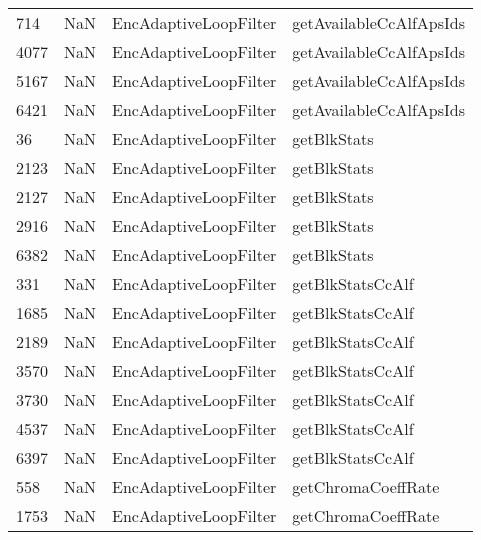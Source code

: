 \begin{tabular}{llll}
714  &                   NaN &      EncAdaptiveLoopFilter &                   getAvailableCcAlfApsIds \\
4077 &                   NaN &      EncAdaptiveLoopFilter &                   getAvailableCcAlfApsIds \\
5167 &                   NaN &      EncAdaptiveLoopFilter &                   getAvailableCcAlfApsIds \\
6421 &                   NaN &      EncAdaptiveLoopFilter &                   getAvailableCcAlfApsIds \\
36   &                   NaN &      EncAdaptiveLoopFilter &                               getBlkStats \\
2123 &                   NaN &      EncAdaptiveLoopFilter &                               getBlkStats \\
2127 &                   NaN &      EncAdaptiveLoopFilter &                               getBlkStats \\
2916 &                   NaN &      EncAdaptiveLoopFilter &                               getBlkStats \\
6382 &                   NaN &      EncAdaptiveLoopFilter &                               getBlkStats \\
331  &                   NaN &      EncAdaptiveLoopFilter &                          getBlkStatsCcAlf \\
1685 &                   NaN &      EncAdaptiveLoopFilter &                          getBlkStatsCcAlf \\
2189 &                   NaN &      EncAdaptiveLoopFilter &                          getBlkStatsCcAlf \\
3570 &                   NaN &      EncAdaptiveLoopFilter &                          getBlkStatsCcAlf \\
3730 &                   NaN &      EncAdaptiveLoopFilter &                          getBlkStatsCcAlf \\
4537 &                   NaN &      EncAdaptiveLoopFilter &                          getBlkStatsCcAlf \\
6397 &                   NaN &      EncAdaptiveLoopFilter &                          getBlkStatsCcAlf \\
558  &                   NaN &      EncAdaptiveLoopFilter &                        getChromaCoeffRate \\
1753 &                   NaN &      EncAdaptiveLoopFilter &                        getChromaCoeffRate \\

\end{tabular}
